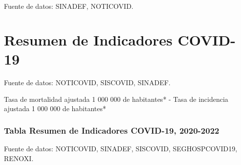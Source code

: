 \documentclass[12pt,a4paper,openany]{book}
\begin{document}
	\begin{table}[h]\caption{Defunciones Cero por COVID-19 a nivel Provincial hasta la SE 51-2022.}
		\resizebox{\textwidth}{!}{%
			
		}
		{\footnotesize {Fuente de datos: SINADEF, NOTICOVID.}}
	\end{table}
	\pagebreak
	\section*{Resumen de Indicadores COVID-19}
	\begin{table}[h]		\caption{Tabla de Letalidad, Mortalidad e Incidencia a nivel Regional por Covid19, 2020 - 2022 (SE 51)}
		\resizebox{\textwidth}{!}{%
			
		}
		{ \footnotesize {Fuente de datos: NOTICOVID, SISCOVID, SINADEF. 
				
				Tasa de mortalidad ajustada 1 000 000 de habitantes* - Tasa de incidencia ajustada 1 000 000 de habitantes*}}
	\end{table}

	\begin{frame}
		\frametitle{Tabla Resumen de Indicadores COVID-19, 2020-2022}
		\vspace{-.5cm}
		
		\begin{table}[]
			\resizebox{\textwidth}{!}{%
				
			}
		\end{table}	
		{\tiny Fuente de datos: NOTICOVID, SINADEF, SISCOVID, SEGHOSPCOVID19, RENOXI. \\}
		\vspace{0.2cm}
	\end{frame}
	
	\clearpage
	
	
	
	
	
	
\end{document}
